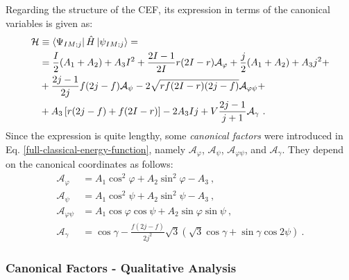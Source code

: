 Regarding the structure of the CEF, its expression in terms of the canonical variables is given as:
\begin{align}
    \mathcal{H}&\equiv\bra{\Psi_{IM;j}}\hat{H}\ket{\psi_{IM;j}}=\nonumber\\
    &=\frac{I}{2}(A_1+A_2)+A_3I^2+\frac{2I-1}{2I}r(2I-r)\mathcal{A}_\varphi+\frac{j}{2}(A_1+A_2)+A_3j^2+\nonumber\\
    &+\frac{2j-1}{2j}f(2j-f)\mathcal{A}_\psi-2\sqrt{rf(2I-r)(2j-f)}\mathcal{A}_{\varphi\psi}+\nonumber\\
    &+A_3\left[r(2j-f)+f(2I-r)\right]-2A_3Ij+V\frac{2j-1}{j+1}\mathcal{A}_\gamma\ .
    \label{full-classical-energy-function}
\end{align}
Since the expression is quite lengthy, some \emph{canonical factors} were introduced in Eq. \ref{full-classical-energy-function}, namely $\mathcal{A}_\varphi$, $\mathcal{A}_\psi$, $\mathcal{A}_{\varphi\psi}$, and $\mathcal{A}_\gamma$. They depend on the canonical coordinates as follows:
\begin{align}
    \mathcal{A}_\varphi&=A_1\cos^2\varphi+A_2\sin^2\varphi-A_3\ ,\nonumber\\
    \mathcal{A}_\psi&=A_1\cos^2\psi+A_2\sin^2\psi-A_3\ ,\nonumber\\
    \mathcal{A}_{\varphi\psi}&=A_1\cos\varphi\cos\psi+A_2\sin\varphi\sin\psi\ ,\nonumber\\
    \mathcal{A}_\gamma&=\cos\gamma-\frac{f(2j-f)}{2j^2}\sqrt{3}\left(\sqrt{3}\cos\gamma+\sin\gamma\cos2\psi\right)\ .
    \label{classical-energy-function-A-factors}
\end{align}

\subsubsection{Canonical Factors - Qualitative Analysis}

